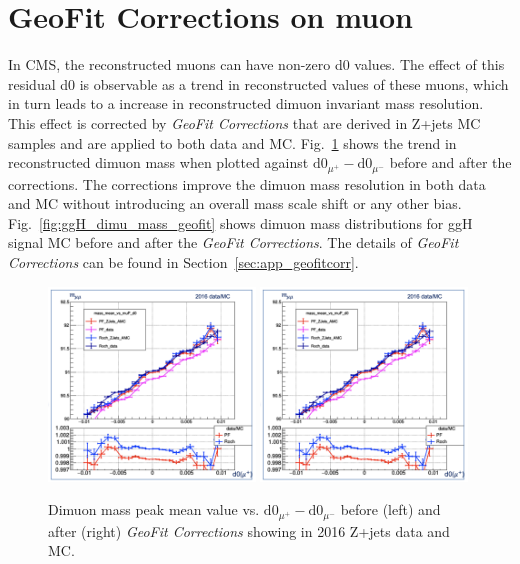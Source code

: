 \section{GeoFit Corrections on muon \pt}
\label{sec:geofitcorr}
In CMS, the reconstructed muons can have non-zero d0 values. The effect of this residual d0 is observable as a trend in reconstructed \pt values of these muons, which in turn leads to a increase in reconstructed dimuon invariant mass resolution. This effect is corrected by \textit{GeoFit Corrections} that are derived in Z+jets MC samples and are applied to both data and MC. Fig.~\ref{fig:dimu_mass_vs_d0} shows the trend in reconstructed dimuon mass when plotted against $\text{d0}_{\mu^+}-\text{d0}_{\mu^-}$ before and after the corrections. The corrections improve the dimuon mass resolution in both data and MC without introducing an overall mass scale shift or any other bias. Fig.~\ref{fig:ggH_dimu_mass_geofit} shows dimuon mass distributions for ggH signal MC before and after the \textit{GeoFit Corrections}. The details of \textit{GeoFit Corrections} can be found in Section~\ref{sec:app_geofitcorr}.


\begin{figure}[h!]
    \centering
    \includegraphics[width=0.49\textwidth]{images_geofit/dimu_mass_vs_d0_Roch.png}
    \includegraphics[width=0.49\textwidth]{images_geofit/dimu_mass_vs_d0_geofit.png}
    \caption{Dimuon mass peak mean value vs. $\text{d0}_{\mu^+}-\text{d0}_{\mu^-}$ before (left) and after (right) \textit{GeoFit Corrections} showing in 2016 Z+jets data and MC.}
    \label{fig:dimu_mass_vs_d0}
\end{figure}


